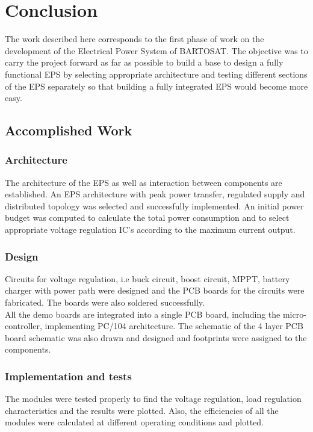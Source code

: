 

\chapter{Conclusion}

The work described here corresponds to the first phase of work on the development of the
Electrical Power System of BARTOSAT. The objective was to carry the project forward as far as
possible to build a base to design a fully functional EPS by selecting appropriate architecture and testing different sections of the EPS separately so that building a fully integrated EPS would become more easy.

\section{Accomplished Work}
\subsection{Architecture}
The architecture of the EPS as well as interaction between components are established. An EPS architecture with peak power transfer, regulated supply and distributed topology was selected and successfully implemented. An initial power budget was computed to calculate the total power consumption and to select appropriate voltage regulation IC's according to the maximum current output.

\subsection{Design}

Circuits for voltage regulation, i.e buck circuit, boost circuit, MPPT, battery charger with power path were designed and the PCB boards for the circuits were fabricated. The boards were also soldered successfully. \\
All the demo boards are integrated into a single PCB board, including the micro-controller, implementing PC/104 architecture. The schematic of the 4 layer PCB board schematic was also drawn and designed and footprints were assigned to the components. 

\subsection{Implementation and tests}
The modules were tested properly to find the voltage regulation, load regulation characteristics and the results were plotted. Also, the efficiencies of all the modules were calculated at different operating conditions and plotted. 

